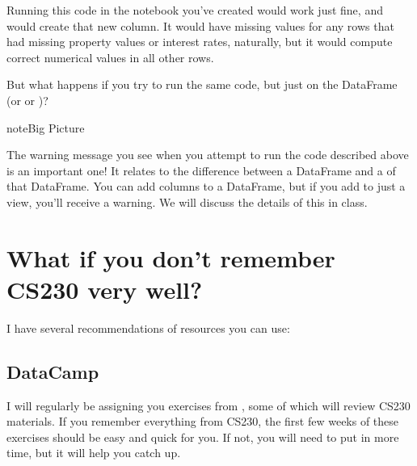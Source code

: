 \documentclass[letterpaper,10pt,english]{sphinxmanual}
\begin{document}
\begin{sphinxVerbatim}[commandchars=\\\{\}]
\PYG{p}{[}\PYG{p}{]}  \PYG{p}{[}\PYG{p}{]}  \PYG{p}{[}\PYG{p}{]}  
\end{sphinxVerbatim}

Running this code in the notebook you’ve created would work just fine, and would create that new column.  It would have missing values for any rows that had missing property values or interest rates, naturally, but it would compute correct numerical values in all other rows.

But what happens if you try to run the same code, but just on the  DataFrame (or  or )?

\begin{sphinxadmonition}{note}{Big Picture}

The warning message you see when you attempt to run the code described above is an important one!  It relates to the difference between a DataFrame and a  of that DataFrame.  You can add columns to a DataFrame, but if you add to just a view, you’ll receive a warning.  We will discuss the details of this in class.
\end{sphinxadmonition}


\section{What if you don’t remember CS230 very well?}
\label{\detokenize{chapter-4-review-of-python-and-pandas:what-if-you-don-t-remember-cs230-very-well}}
I have several recommendations of resources you can use:


\subsection{DataCamp}
\label{\detokenize{chapter-4-review-of-python-and-pandas:datacamp}}
I will regularly be assigning you exercises from , some of which will review CS230 materials.  If you remember everything from CS230, the first few weeks of these exercises should be easy and quick for you.  If not, you will need to put in more time, but it will help you catch up.
\end{document}
